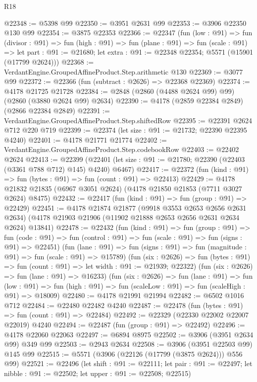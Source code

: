 \begin{lexlean}{R18}
\begin{coremodule}
@22348 := @5398 @99
@22350 := @3951 @2631 @99
@22353 := @3906 @22350 @130 @99
@22354 := @3875 @22353
@22366 := @22347
    (fun (low : @91) =>
    fun (divisor : @91) =>
    fun (high : @91) =>
    fun (plane : @91) =>
    fun (scale : @91) =>
    let part : @91 := @21680; let extra : @91 := @22348 @22354; @5571 (@15901 (@17799 @2624)))
@22368 := VerdantEngine.GroupedAffineProduct.Step.arithmetic @130
@22369 := @3077 @99
@22372 := @22366 (fun (subtract : @2626) => @22368 @22369)
@22374 := @4178 @21725 @21728
@22384 := @2848 (@2860 (@4488 @2624 @99) @99) (@2860 (@3880 @2624 @99) @2634)
@22390 := @4178 (@2859 @22384 @2849) (@2866 @22384 @2849)
@22391 := VerdantEngine.GroupedAffineProduct.Step.shiftedRow
@22395 := @22391 @2624 @712 @220 @719
@22399 := @22374 (let size : @91 := @21732; @22390 @22395 @4240)
@22401 := @4178 @21771 @21774
@22402 := VerdantEngine.GroupedAffineProduct.Step.codebookRow
@22403 := @22402 @2624
@22413 := @22399
    (@22401 (let size : @91 := @21780; @22390 (@22403 (@3361 @788 @712) @145) @4240) @6467)
@22417 := @22372 (fun (kind : @91) => fun (bytes : @91) => fun (count : @91) => @22413)
@22429 := @4178 @21832 @21835 (@6967 @3051 @2624) (@4178 @21850 @21853 (@7711 @3027 @2624) @8475)
@22432 := @22417 (fun (kind : @91) => fun (group : @91) => @22429)
@22451 := @4178
    @21874
    @21877
    (@9918 @3553 @2653 @2656 @2631 @2634)
    (@4178 @21903 @21906 (@11902 @21888 @2653 @2656 @2631 @2634 @2624) @13841)
@22478 := @22432
    (fun (kind : @91) =>
    fun (group : @91) =>
    fun (code : @91) => fun (control : @91) => fun (scale : @91) => fun (signs : @91) => @22451)
    (fun (lane : @91) => fun (signs : @91) => fun (magnitude : @91) => fun (scale : @91) => @15789)
    (fun (six : @2626) =>
    fun (bytes : @91) => fun (count : @91) => let width : @91 := @21939; @22322)
    (fun (six : @2626) => fun (lane : @91) => @16233)
    (fun (six : @2626) =>
    fun (lane : @91) =>
    fun (low : @91) => fun (high : @91) => fun (scaleLow : @91) => fun (scaleHigh : @91) => @18009)
@22480 := @4178 @21991 @21994
@22482 := @6502 @1016 @712
@22484 := @22480 @22482 @4240
@22487 := @22478 (fun (bytes : @91) => fun (count : @91) => @22484)
@22492 := @22329 (@22330 @22002 @22007 @22019) @4240
@22494 := @22487 (fun (group : @91) => @22492)
@22496 := @4178 @22060 @22063
@22497 := @6894 @8975
@22502 := @3906 (@3951 @2634 @99) @349 @99
@22503 := @2943 @2634
@22508 := @3906 (@3951 @22503 @99) @145 @99
@22515 := @5571 (@3906 (@22126 (@17799 (@3875 @2624))) @556 @99)
@22521 := @22496
    (let shift : @91 := @22111;
    let pair : @91 := @22497; let nibble : @91 := @22502; let upper : @91 := @22508; @22515)

\end{coremodule}
\end{lexlean}
